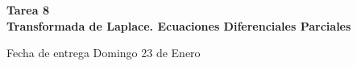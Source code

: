 \documentclass[12pt]{exam}
\begin{document}
\centering


\Large 
\textbf{\huge Tarea 8 \\ \large Transformada de Laplace. Ecuaciones Diferenciales Parciales}

\small
Fecha de entrega Domingo 23 de Enero
\vskip10pt

\normalsize

\pointformat{\bfseries\boldmath(\thepoints)}
\vskip10pt
\end{document}

